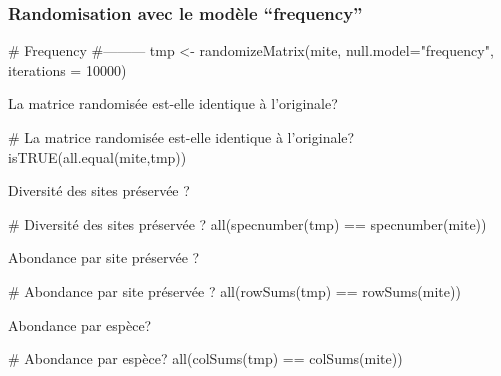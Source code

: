 \documentclass[]{article}
\newenvironment{Shaded}{\begin{snugshade}}{\end{snugshade}}
\newcommand{\KeywordTok}[1]{\textcolor[rgb]{0.94,0.87,0.69}{#1}}
\newcommand{\DataTypeTok}[1]{\textcolor[rgb]{0.87,0.87,0.75}{#1}}
\newcommand{\DecValTok}[1]{\textcolor[rgb]{0.86,0.86,0.80}{#1}}
\newcommand{\StringTok}[1]{\textcolor[rgb]{0.80,0.58,0.58}{#1}}
\newcommand{\CommentTok}[1]{\textcolor[rgb]{0.50,0.62,0.50}{#1}}
\newcommand{\OperatorTok}[1]{\textcolor[rgb]{0.94,0.94,0.82}{#1}}
\newcommand{\NormalTok}[1]{\textcolor[rgb]{0.80,0.80,0.80}{#1}}
\begin{document}
\subsubsection{\texorpdfstring{Randomisation avec le modèle
``frequency''}{Randomisation avec le modèle frequency}}\label{randomisation-avec-le-modele-frequency}

\begin{Shaded}
\begin{Highlighting}[]
\CommentTok{# Frequency}
\CommentTok{#---------}
\NormalTok{tmp <-}\StringTok{ }\KeywordTok{randomizeMatrix}\NormalTok{(mite, }\DataTypeTok{null.model=}\StringTok{"frequency"}\NormalTok{, }\DataTypeTok{iterations =} \DecValTok{10000}\NormalTok{)}
\end{Highlighting}
\end{Shaded}

La matrice randomisée est-elle identique à l'originale?

\begin{Shaded}
\begin{Highlighting}[]
\CommentTok{# La matrice randomisée est-elle identique à l'originale?}
\KeywordTok{isTRUE}\NormalTok{(}\KeywordTok{all.equal}\NormalTok{(mite,tmp))}
\end{Highlighting}
\end{Shaded}

Diversité des sites préservée ?

\begin{Shaded}
\begin{Highlighting}[]
\CommentTok{# Diversité des sites préservée ?}
\KeywordTok{all}\NormalTok{(}\KeywordTok{specnumber}\NormalTok{(tmp) }\OperatorTok{==}\StringTok{ }\KeywordTok{specnumber}\NormalTok{(mite))}
\end{Highlighting}
\end{Shaded}

Abondance par site préservée ?

\begin{Shaded}
\begin{Highlighting}[]
\CommentTok{# Abondance par site préservée ?}
\KeywordTok{all}\NormalTok{(}\KeywordTok{rowSums}\NormalTok{(tmp) }\OperatorTok{==}\StringTok{ }\KeywordTok{rowSums}\NormalTok{(mite))}
\end{Highlighting}
\end{Shaded}

Abondance par espèce?

\begin{Shaded}
\begin{Highlighting}[]
\CommentTok{# Abondance par espèce?}
\KeywordTok{all}\NormalTok{(}\KeywordTok{colSums}\NormalTok{(tmp) }\OperatorTok{==}\StringTok{ }\KeywordTok{colSums}\NormalTok{(mite))}
\end{Highlighting}
\end{Shaded}
\end{document}

